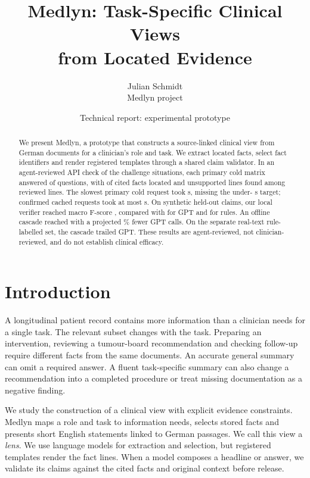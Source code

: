 \documentclass[10pt]{article}
\title{Medlyn: Task-Specific Clinical Views\\from Located Evidence}
\author{Julian Schmidt\\Medlyn project}
\date{Technical report: experimental prototype}
\begin{document}
\maketitle
\begin{abstract}
We present Medlyn, a prototype that constructs a source-linked clinical view from
German documents for a clinician's role and task. We extract located facts, select
fact identifiers and render registered templates through a shared claim validator.
In an agent-reviewed API check of the challenge situations, each primary cold matrix
answered \ReviewedAnswerPassed{} of \ReviewedAnswerTotal{} questions, with
\ReviewedTraceLocated{} of \ReviewedTraceTotal{} cited facts located and
\ReviewedUnsupported{} unsupported lines found among \ReviewedLines{} reviewed lines.
The slowest primary cold request took \ReviewedColdSeconds{} s, missing the
under-\ChallengeLimit{} s target; confirmed cached requests took at most
\ReviewedCachedSeconds{} s. On synthetic held-out claims, our local verifier reached
macro F-score \LocalVerifierFscore{}, compared with \ProxyVerifierFscore{} for GPT
and \RulesVerifierFscore{} for rules. An offline cascade reached
\CascadeVerifierFscore{} with a projected \CascadeSavedPercent{}\% fewer GPT calls.
On the separate real-text rule-labelled set, the cascade trailed GPT. These results
are agent-reviewed, not clinician-reviewed, and do not establish clinical efficacy.
\end{abstract}

\section{Introduction}
A longitudinal patient record contains more information than a clinician needs for a
single task. The relevant subset changes with the task. Preparing an intervention,
reviewing a tumour-board recommendation and checking follow-up require different
facts from the same documents. An accurate general summary can omit a required
answer. A fluent task-specific summary can also change a recommendation into a
completed procedure or treat missing documentation as a negative finding.

We study the construction of a clinical view with explicit evidence constraints.
Medlyn maps a role and task to information needs, selects stored facts and presents
short English statements linked to German passages. We call this view a \emph{lens}.
We use language models for extraction and selection, but registered templates render
the fact lines. When a model composes a headline or answer, we validate its claims
against the cited facts and original context before release.
\end{document}
